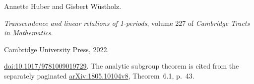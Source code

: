 Annette Huber and Gisbert W{\"u}stholz.

\newblock \emph{Transcendence and linear relations of 1-periods}, volume 227 of
  \emph{Cambridge Tracts in Mathematics}.

\newblock Cambridge University Press, 2022.

\newblock \href{https://doi.org/10.1017/9781009019729}{doi:10.1017/9781009019729}.
\newblock The analytic subgroup theorem is cited from the separately paginated
  \href{https://arxiv.org/abs/1805.10104v8}{arXiv:1805.10104v8}, Theorem~6.1, p.~43.
